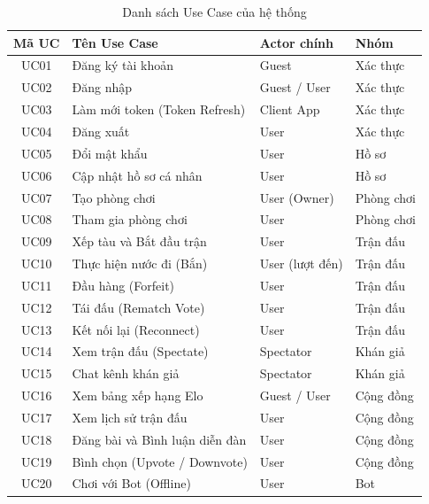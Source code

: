 \documentclass[13pt, a4paper]{extreport}
\begin{document}
\begin{table}[H]
  \centering
  \caption{Danh sách Use Case của hệ thống}
  \label{tab:usecase}
  \renewcommand{\arraystretch}{1.25}
  \begin{tabularx}{\textwidth}{c X l l}
    \toprule
    \textbf{Mã UC} & \textbf{Tên Use Case}                    & \textbf{Actor chính}   & \textbf{Nhóm}   \\
    \midrule
    UC01 & Đăng ký tài khoản                        & Guest                  & Xác thực        \\
    UC02 & Đăng nhập                                & Guest / User           & Xác thực        \\
    UC03 & Làm mới token (Token Refresh)            & Client App             & Xác thực        \\
    UC04 & Đăng xuất                                & User                   & Xác thực        \\
    UC05 & Đổi mật khẩu                             & User                   & Hồ sơ          \\
    UC06 & Cập nhật hồ sơ cá nhân                  & User                   & Hồ sơ          \\
    UC07 & Tạo phòng chơi                           & User (Owner)           & Phòng chơi      \\
    UC08 & Tham gia phòng chơi                      & User                   & Phòng chơi      \\
    UC09 & Xếp tàu và Bắt đầu trận                 & User                   & Trận đấu        \\
    UC10 & Thực hiện nước đi (Bắn)                  & User (lượt đến)        & Trận đấu        \\
    UC11 & Đầu hàng (Forfeit)                       & User                   & Trận đấu        \\
    UC12 & Tái đấu (Rematch Vote)                   & User                   & Trận đấu        \\
    UC13 & Kết nối lại (Reconnect)                  & User                   & Trận đấu        \\
    UC14 & Xem trận đấu (Spectate)                  & Spectator              & Khán giả        \\
    UC15 & Chat kênh khán giả                       & Spectator              & Khán giả        \\
    UC16 & Xem bảng xếp hạng Elo                   & Guest / User           & Cộng đồng       \\
    UC17 & Xem lịch sử trận đấu                     & User                   & Cộng đồng       \\
    UC18 & Đăng bài và Bình luận diễn đàn           & User                   & Cộng đồng       \\
    UC19 & Bình chọn (Upvote / Downvote)            & User                   & Cộng đồng       \\
    UC20 & Chơi với Bot (Offline)                   & User                   & Bot             \\
    \bottomrule
  \end{tabularx}
\end{table}
\end{document}
